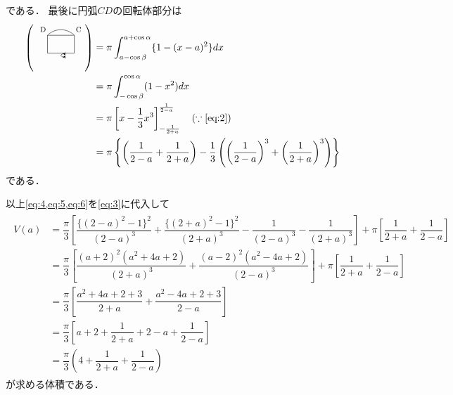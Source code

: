 \documentclass[../../main.tex]{subfiles}
\begin{document}
である．
最後に円弧$CD$の回転体部分は
\begin{align}
  \left( \text{
      \begin{tikzpicture}[baseline={(0,0.1)}, scale=0.8, >=stealth]
        \draw (0,0) -- (1.2,0);
        \draw (0,0.8) -- (1.2,0.8);
        \draw (0,0) -- (0,0.8);
        \draw (1.2,0) -- (1.2,0.8);
        \draw (0,0.8) to[out=45, in=135] (1.2,0.8);
        \draw[->] (0.6, -0.1) arc (200:340:0.1);
        \draw[->] (0.6, -0.1) arc (160:20:0.1);
        \node[anchor=south east, font=\scriptsize, xshift=2pt] at (0,0.8) {D};
        \node[anchor=south west, font=\scriptsize, xshift=-2pt] at (1.2,0.8) {C};
  \end{tikzpicture}} \right)
  &=\pi\int_{a-\cos\beta}^{a+\cos\alpha}\{1-(x-a)^2\}dx \\
  &=\pi\int_{-\cos\beta}^{\cos\alpha}(1-x^2)dx \\
  &=\pi\left[x-\dfrac{1}{3}x^3\right]_{-\frac{1}{2+a}}^{\frac{1}{2-a}} \quad(\because\text{\cref{eq:2}}) \\
  &=\pi\left\{\left(\dfrac{1}{2-a}+\dfrac{1}{2+a}\right)-\dfrac{1}{3}\left(\left(\dfrac{1}{2-a}\right)^3+\left(\dfrac{1}{2+a}\right)^3\right)\right\} \label{eq:6}
\end{align}
である．

以上\cref{eq:4,eq:5,eq:6}を\cref{eq:3}に代入して
\begin{align}
  \begin{split}
    V(a)
    &=\dfrac{\pi}{3}\left[\dfrac{\{(2-a)^2-1\}^2}{(2-a)^3}+\dfrac{\{(2+a)^2-1\}^2}{(2+a)^3}-\dfrac{1}{(2-a)^3}-\dfrac{1}{(2+a)^3}\right]+\pi\left[\dfrac{1}{2+a}+\dfrac{1}{2-a}\right] \\
    &=\dfrac{\pi}{3}\left[\dfrac{(a+2)^2(a^2+4a+2)}{(2+a)^3}+\dfrac{(a-2)^2(a^2-4a+2)}{(2-a)^3}\right]+\pi\left[\dfrac{1}{2+a}+\dfrac{1}{2-a}\right] \\
    &=\dfrac{\pi}{3}\left[\dfrac{a^2+4a+2+3}{2+a}+\dfrac{a^2-4a+2+3}{2-a}\right] \\
    &=\dfrac{\pi}{3}\left[a+2+\dfrac{1}{2+a}+2-a+\dfrac{1}{2-a}\right] \\
    &=\dfrac{\pi}{3}\left(4+\dfrac{1}{2+a}+\dfrac{1}{2-a}\right)
  \end{split}
\end{align}
が求める体積である．

\newpage
\end{document}
